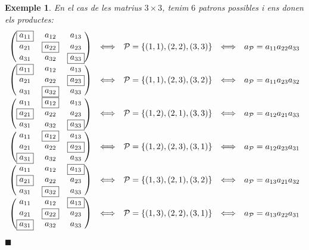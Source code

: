 \documentclass[
  11pt,
]{book}
\numberwithin{dummy}{section}
\theoremstyle{maincolornumbox}
\theoremstyle{blacknumex}
\newtheorem{exampleT}{Exemple}[chapter]
\theoremstyle{blacknumbox}
\theoremstyle{maincolornum}
\newenvironment{example}{\begin{exampleT}}{\hfill{\tiny\ensuremath{\blacksquare}}\end{exampleT}}
\begin{document}
\begin{example}
En el cas de les matrius \(3\times 3\), tenim \(6\) patrons possibles i ens
donen els productes: \[\begin{array}{ccccc}
\begin{pmatrix} \boxed{a_{11}} & a_{12} & a_{13}\\ a_{21} & \boxed{a_{22}} & a_{23}\\ a_{31} & a_{32} & \boxed{a_{33}} \end{pmatrix} & \Longleftrightarrow & \mathcal{P}=\{(1,1),(2,2),(3,3)\} &   \Longleftrightarrow & a_{\mathcal{P}}=a_{11}a_{22}a_{33} \\
\begin{pmatrix} \boxed{a_{11}} & a_{12} & a_{13}\\ a_{21} & a_{22} & \boxed{a_{23}}\\ a_{31} & \boxed{a_{32}} & a_{33} \end{pmatrix} & \Longleftrightarrow & \mathcal{P}=\{(1,1),(2,3),(3,2)\} &   \Longleftrightarrow & a_{\mathcal{P}}=a_{11}a_{23}a_{32} \\
\begin{pmatrix} a_{11} & \boxed{a_{12}} & a_{13}\\ \boxed{a_{21}} & a_{22} & a_{23}\\ a_{31} & a_{32} & \boxed{a_{33}} \end{pmatrix} & \Longleftrightarrow & \mathcal{P}=\{(1,2),(2,1),(3,3)\} &   \Longleftrightarrow & a_{\mathcal{P}}=a_{12}a_{21}a_{33} \\
\begin{pmatrix} a_{11} & \boxed{a_{12}} & a_{13}\\ a_{21} & a_{22} & \boxed{a_{23}}\\ \boxed{a_{31}} & a_{32} & a_{33} \end{pmatrix} & \Longleftrightarrow & \mathcal{P}=\{(1,2),(2,3),(3,1)\} &   \Longleftrightarrow & a_{\mathcal{P}}=a_{12}a_{23}a_{31} \\
\begin{pmatrix} a_{11} & a_{12} & \boxed{a_{13}}\\ \boxed{a_{21}} & a_{22} & a_{23}\\ a_{31} & \boxed{a_{32}} & a_{33} \end{pmatrix} & \Longleftrightarrow & \mathcal{P}=\{(1,3),(2,1),(3,2)\} &   \Longleftrightarrow & a_{\mathcal{P}}=a_{13}a_{21}a_{32} \\
\begin{pmatrix} a_{11} & a_{12} & \boxed{a_{13}}\\ a_{21} & \boxed{a_{22}} & a_{23}\\ \boxed{a_{31}} & a_{32} & a_{33} \end{pmatrix} & \Longleftrightarrow & \mathcal{P}=\{(1,3),(2,2),(3,1)\} &   \Longleftrightarrow & a_{\mathcal{P}}=a_{13}a_{22}a_{31} 
    \end{array}\]
\end{example}
\end{document}
